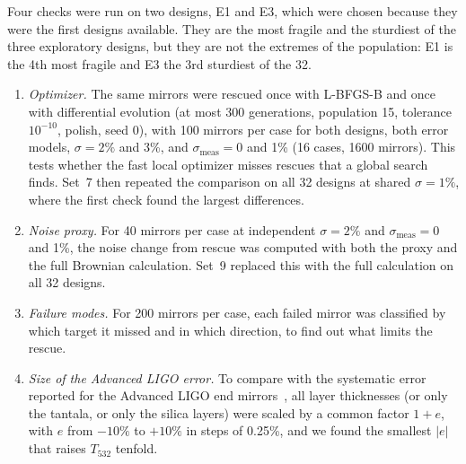 Four checks were run on two designs, E1 and E3, which were chosen because they were the first designs available. They are the most fragile and the sturdiest of the three exploratory designs, but they are not the extremes of the population: E1 is the 4th most fragile and E3 the 3rd sturdiest of the 32.
\begin{enumerate}
\item \emph{Optimizer.} The same mirrors were rescued once with L-BFGS-B and once with differential evolution (at most 300 generations, population 15, tolerance $10^{-10}$, polish, seed 0), with 100 mirrors per case for both designs, both error models, $\sigma = 2\%$ and 3\%, and $\sigma_{\mathrm{meas}} = 0$ and 1\% (16 cases, 1600 mirrors). This tests whether the fast local optimizer misses rescues that a global search finds. Set~7 then repeated the comparison on all 32 designs at shared $\sigma = 1\%$, where the first check found the largest differences.
\item \emph{Noise proxy.} For 40 mirrors per case at independent $\sigma = 2\%$ and $\sigma_{\mathrm{meas}} = 0$ and 1\%, the noise change from rescue was computed with both the proxy and the full Brownian calculation. Set~9 replaced this with the full calculation on all 32 designs.
\item \emph{Failure modes.} For 200 mirrors per case, each failed mirror was classified by which target it missed and in which direction, to find out what limits the rescue.
\item \emph{Size of the Advanced LIGO error.} To compare with the systematic error reported for the Advanced LIGO end mirrors~\cite{aLIGO2015}, all layer thicknesses (or only the tantala, or only the silica layers) were scaled by a common factor $1+e$, with $e$ from $-10\%$ to $+10\%$ in steps of 0.25\%, and we found the smallest $|e|$ that raises $T_{532}$ tenfold.
\end{enumerate}
